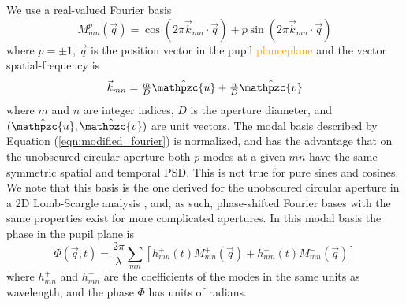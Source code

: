 \documentclass[10pt,preprint]{aastex631}
\newcommand{\ogadd}[1]{\textcolor{orange}{#1}}
\newcommand{\ogrmv}[1]{\textcolor{orange}{\sout{#1}}}
\begin{document}
We use a real-valued Fourier basis
\begin{equation}
M_{mn}^p(\vec{q}) = \cos(2\pi \vec{k}_{mn} \cdot \vec{q}) + p  \sin(2\pi \vec{k}_{mn} \cdot \vec{q})
\label{eqn:modified_fourier}
\end{equation}
where $p=\pm 1$, $\vec{q}$ is the position vector in the pupil \ogrmv{plance}\ogadd{plane} and the vector spatial-frequency is 
\begin{equation}
\textstyle\vec{k}_{mn} = \textstyle\frac{m}{D} \hat{\mathpzc{u}} + \textstyle\frac{n}{D} \hat{\mathpzc{v}}
\label{eqn:kq_def}
\end{equation}
where $m$ and $n$ are integer indices, $D$ is the aperture diameter, and $(\hat{\mathpzc{u}},\hat{\mathpzc{v}})$ are unit vectors.  The modal basis described by Equation (\ref{eqn:modified_fourier}) is normalized, and has the advantage that on the unobscured circular aperture both $p$ modes at a given $mn$ have the same symmetric spatial and temporal PSD.  This is not true for pure sines and cosines.  We note that this basis is the one derived for the unobscured circular aperture in a 2D Lomb-Scargle analysis \citep{2020arXiv200110200S}, and, as such, phase-shifted Fourier bases with the same properties exist for more complicated apertures.  In this modal basis the phase in the pupil plane is
\begin{equation}
\Phi(\vec{q},t) = \frac{2\pi}{\lambda} \sum\limits_{mn} \left[ h_{mn}^{+}(t) M_{mn}^{+}(\vec{q}) + h_{mn}^{-}(t) M_{mn}^{-}(\vec{q})\right]
\label{eqn:phi_expansion}
\end{equation}
where $h_{mn}^{+}$ and $h_{mn}^{-}$ are the coefficients of the modes in the same units as wavelength, and the phase $\Phi$ has units of radians.
\end{document}
